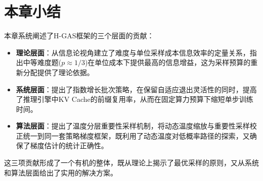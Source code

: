 \section{本章小结}
\label{sec:method_summary}

本章系统阐述了H-GAS框架的三个层面的贡献：

\begin{itemize}
    \item \textbf{理论层面}：从信息论视角建立了难度与单位采样成本信息效率的定量关系，指出中等难度题($p \approx 1/3$)在单位成本下提供最高的信息增益，这为采样预算的重新分配提供了理论依据。
    
    \item \textbf{系统层面}：提出了指数增长批次策略，在保留自适应退出灵活性的同时，提高了推理引擎中KV Cache的前缀复用率，从而在固定算力预算下缩短单步训练时间。
    
    \item \textbf{算法层面}：提出了温度分层重要性采样机制，将动态温度缩放与重要性采样校正统一到同一套策略梯度框架，既利用了动态温度对低概率路径的探索，又确保了梯度估计的统计正确性。
\end{itemize}

这三项贡献形成了一个有机的整体，既从理论上揭示了最优采样的原则，又从系统和算法层面给出了实用的解决方案。
